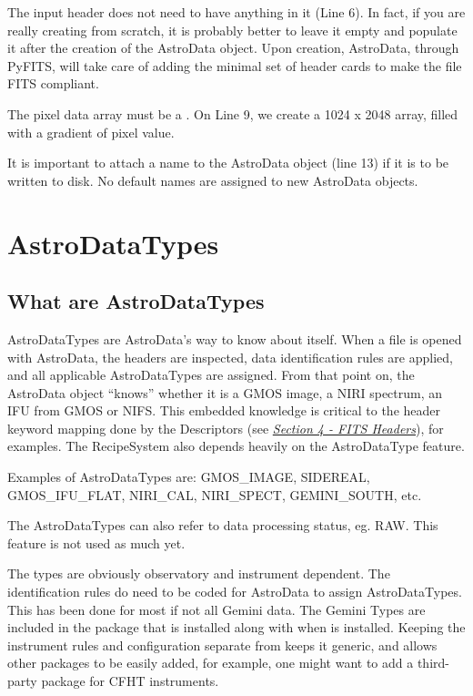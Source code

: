 \documentclass[letterpaper,10pt,english]{sphinxmanual}
\begin{document}
The input header does not need to have anything in it (Line 6).  In fact, if
you are really creating from scratch, it is probably better to leave it empty
and populate it after the creation of the AstroData object.  Upon creation,
AstroData, through PyFITS, will take care of adding the minimal set of header
cards to make the file FITS compliant.

The pixel data array must be a .  On Line 9, we create a
1024 x 2048 array, filled with a gradient of pixel value.

It is important to attach a name to the AstroData object (line 13) if it is to
be written to disk.  No default names are assigned to new AstroData objects.


\chapter{AstroDataTypes}
\label{types:astrodatatypes}\label{types::doc}\label{types:types}

\section{What are AstroDataTypes}
\label{types:what-are-astrodatatypes}
AstroDataTypes are AstroData's way to know about itself.  When a file is
opened with AstroData, the headers are inspected, data identification rules
are applied, and all applicable AstroDataTypes are assigned.  From that point
on, the AstroData object ``knows'' whether it is a GMOS image, a NIRI spectrum,
an IFU from GMOS or NIFS. This embedded knowledge is critical to the header
keyword mapping done by the Descriptors (see
{\hyperref[headers:headers]{\emph{Section 4 - FITS Headers}}}), for examples.
The RecipeSystem also depends heavily on the AstroDataType feature.

Examples of AstroDataTypes are: GMOS\_IMAGE, SIDEREAL, GMOS\_IFU\_FLAT, NIRI\_CAL,
NIRI\_SPECT, GEMINI\_SOUTH, etc.

The AstroDataTypes can also refer to data processing status, eg. RAW.  This
feature is not used as much yet.

The types are obviously observatory and instrument dependent.  The
identification rules do need to be coded for AstroData to assign
AstroDataTypes.  This has been done for most if not all Gemini data.  The
Gemini Types are included in the  package that is
installed along with  when  is installed.
Keeping the instrument rules and configuration separate from 
keeps it generic, and allows other packages to be easily added, for example,
one might want to add a third-party package for CFHT instruments.
\end{document}
